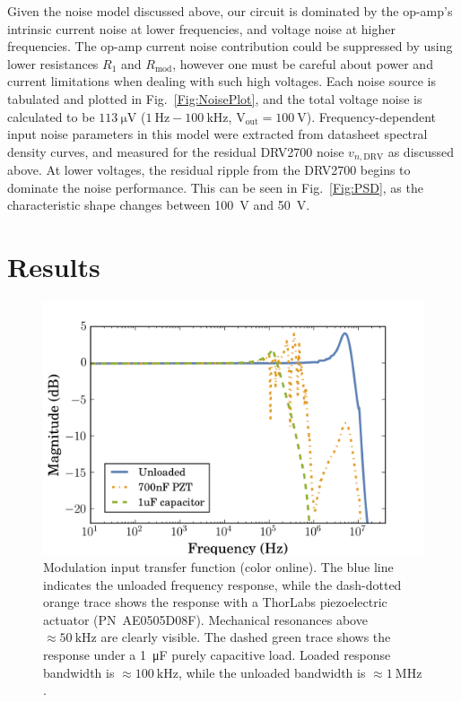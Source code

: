 \documentclass[aip,rsi,reprint]{revtex4-1} %
\begin{document}
Given the noise model discussed above, our circuit is dominated by the op-amp's intrinsic current noise at lower frequencies, and voltage noise at higher frequencies.
The op-amp current noise contribution could be suppressed by using lower resistances $R_1$ and $R_\text{mod}$, however one must be careful about power and current limitations when dealing with such high voltages.
Each noise source is tabulated and plotted in Fig.~\ref{Fig:NoisePlot}, and the total voltage noise  is calculated to be $\SI{113}{\micro\volt}$ ($\SI{1}{\hertz} - \SI{100}{\kilo\hertz}$, $\text{V}_\text{out} = \SI{100}{\volt}$).
Frequency-dependent input noise parameters in this model were extracted from datasheet spectral density curves\cite{LM7171Datasheet,AD56XXRDatasheet}, and measured for the residual DRV2700 noise $v_{n,\text{DRV}}$ as discussed above.
At lower voltages, the residual ripple from the DRV2700 begins to dominate the noise performance.
This can be seen in Fig.~\ref{Fig:PSD}, as the characteristic shape changes between \SI{100}{\volt} and \SI{50}{\volt}.

\section{Results}
\label{Sec:Results}

\begin{figure}[t]
\includegraphics[width=\columnwidth]{fig/PiezoModulationTransfer.png}
\caption{Modulation input transfer function (color online). The blue line indicates the unloaded frequency response, while the dash-dotted orange trace shows the response with a ThorLabs piezoelectric actuator {(PN~AE0505D08F)}. Mechanical resonances above $\approx\SI{50}{\kilo\hertz}$ are clearly visible. The dashed green trace shows the response under a \SI{1}{\micro\farad} purely capacitive load. Loaded response bandwidth is $\approx\SI{100}{\kilo\hertz}$, while the unloaded bandwidth is $\approx\SI{1}{\mega\hertz}$.\label{Fig:TransferFunc}}
\end{figure}
\end{document}
